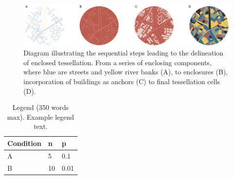 \documentclass[fleqn,10pt]{wlscirep}
\begin{document}
\begin{figure}
    \includegraphics[width=\linewidth]{fig/et_diagram.pdf}
    \caption{Diagram illustrating the sequential steps leading to the delineation of
    enclosed tessellation. From a series of enclosing components, where blue are streets
    and yellow river banks (A), to enclosures (B), incorporation of buildings as anchors
    (C) to final tessellation cells (D).}
    \label{fig:et_diagram}
\end{figure}

\begin{table}[ht]
\centering
\begin{tabular}{|l|l|l|}
\hline
Condition & n & p \\
\hline
A & 5 & 0.1 \\
\hline
B & 10 & 0.01 \\
\hline
\end{tabular}
\caption{\label{tab:example}Legend (350 words max). Example legend text.}
\end{table}
\end{document}
